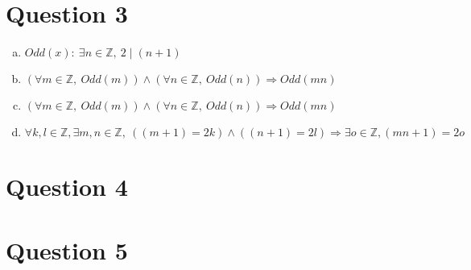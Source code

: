 \documentclass[12pt]{article}
\begin{document}
\section*{Question 3}

\begin{enumerate}[a)]
    \item
        $Odd(x):\: \exists n \in \mathbb{Z},\: 2 \mid (n+1)$
    \item
        $(\forall m \in \mathbb{Z},\:Odd(m))\land(\forall n \in \mathbb{Z},\:Odd(n)) \Rightarrow Odd(mn)$
    \item
        $(\forall m \in \mathbb{Z},\:Odd(m))\land(\forall n \in \mathbb{Z},\:Odd(n)) \Rightarrow Odd(mn)$
    \item
        $\forall k,l \in \mathbb{Z}, \exists m,n \in \mathbb{Z},\:((m+1)=2k)\land((n+1)=2l) \Rightarrow \exists o \in \mathbb{Z}, (mn+1)=2o$
\end{enumerate}


\section*{Question 4}

\section*{Question 5}
\end{document}
